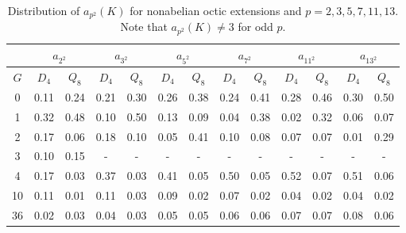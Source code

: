 \documentclass[letterpaper, 10pt]{article}
\newcommand{\1}{\mathds{1}}	%
\theoremstyle{definition}
\theoremstyle{remark}
\begin{document}
\begin{table}[H]
    \begin{center}
        \begin{tabular}{c|c|c|c|c|c|c|c|c|c|c|c|c}
            \toprule
             & \multicolumn{2}{c|}{$a_{2^2}$} & \multicolumn{2}{c|}{$a_{3^2}$} & \multicolumn{2}{c|}{$a_{5^2}$} & \multicolumn{2}{c|}{$a_{7^2}$} & \multicolumn{2}{c|}{$a_{11^2}$} & \multicolumn{2}{c}{$a_{13^2}$} \\
            \midrule
            $G$ & $D_4$ & $Q_8$ & $D_4$ & $Q_8$ & $D_4$ & $Q_8$ & $D_4$ & $Q_8$ & $D_4$ & $Q_8$ & $D_4$ & $Q_8$ \\
            \midrule
            0 & 0.11 & 0.24 & 0.21 & 0.30 & 0.26 & 0.38 & 0.24 & 0.41 & 0.28 & 0.46 & 0.30 & 0.50 \\
            1 & 0.32 & 0.48 & 0.10 & 0.50 & 0.13 & 0.09 & 0.04 & 0.38 & 0.02 & 0.32 & 0.06 & 0.07 \\
            2 & 0.17 & 0.06 & 0.18 & 0.10 & 0.05 & 0.41 & 0.10 & 0.08 & 0.07 & 0.07 & 0.01 & 0.29 \\
            3 & 0.10 & 0.15 & - & - & - & - & - & - & - & - & - & - \\
            4 & 0.17 & 0.03 & 0.37 & 0.03 & 0.41 & 0.05 & 0.50 & 0.05 & 0.52 & 0.07 & 0.51 & 0.06 \\
            10 & 0.11 & 0.01 & 0.11 & 0.03 & 0.09 & 0.02 & 0.07 & 0.02 & 0.04 & 0.02 & 0.04 & 0.02 \\
            36 & 0.02 & 0.03 & 0.04 & 0.03 & 0.05 & 0.05 & 0.06 & 0.06 & 0.07 & 0.07 & 0.08 & 0.06 \\
            \bottomrule
        \end{tabular}
        \caption{Distribution of $a_{p^2}(K)$ for nonabelian octic extensions and $p = 2, 3, 5, 7, 11, 13$. Note that $a_{p^2}(K) \ne 3$ for odd $p$.}
        \label{tab:octic_nab_psq_dist}
    \end{center}
\end{table}
\end{document}
